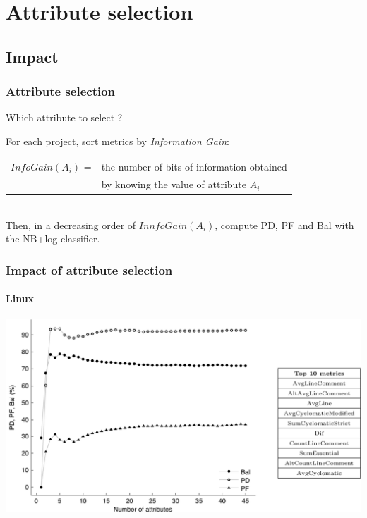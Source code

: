 \section{Attribute selection}
\subsection{Impact}

\begin{frame}
 \frametitle{Attribute selection}
 \begin{center}
  \alert{Which attribute to select ?}
 \end{center}
 For each project, sort metrics by \emph{Information Gain}:\\
 \vspace{0.2cm}
 \begin{tabular}{ll}
  $InfoGain(A_i)$ = & the number of bits of information obtained\\
   & by knowing the value of attribute $A_i$
 \end{tabular}
 \\
 \vspace{0.4cm}
 Then, in a decreasing order of $InnfoGain(A_i)$, compute PD, PF and Bal with the NB+log classifier.
\end{frame}

\begin{frame}
 \frametitle{Impact of attribute selection}
 \framesubtitle{Linux}
 \begin{center}
  \includegraphics[width=\textwidth]{figures/attributesLinux.png}
 \end{center}
\end{frame}

